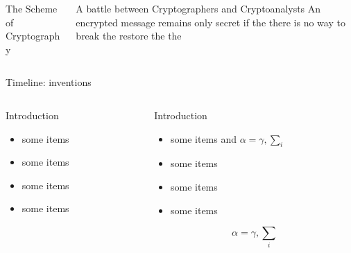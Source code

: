 \documentclass[final,hyperref={pdfpagelabels=false}]{beamer}
\begin{document}
\begin{frame}{}
\begin{columns}[t]
\begin{column}{.48\linewidth}
\begin{block}{\large The Scheme of Cryptography}
\begin{figure}
    \end{figure}
    \end{block}
    \end{column}
    \begin{column}{.48\linewidth}
      \begin{block}{\large A battle between Cryptographers and Cryptoanalysts}
        An encrypted message remains only secret if the there is no way to break the restore the the 
      \end{block}
    \end{column}
    \end{columns}
    \vfill
    \vfill
    \begin{block}{\large Timeline: inventions}
      \begin{figure}
      \centering
      \begin{tikzpicture}

      \end{tikzpicture}
      \end{figure}
    \end{block}
    \vfill
    \begin{columns}[t]
      \begin{column}{.48\linewidth}
        \begin{block}{Introduction}
          \begin{itemize}
          \item some items
          \item some items
          \item some items
          \item some items
          \end{itemize}
        \end{block}
      \end{column}
      \begin{column}{.48\linewidth}
        \begin{block}{Introduction}
          \begin{itemize}
          \item some items and $\alpha=\gamma, \sum_{i}$
          \item some items
          \item some items
          \item some items
          \end{itemize}
          $$\alpha=\gamma, \sum_{i}$$
        \end{block}


\end{column}
\end{columns}
\end{frame}
\end{document}
